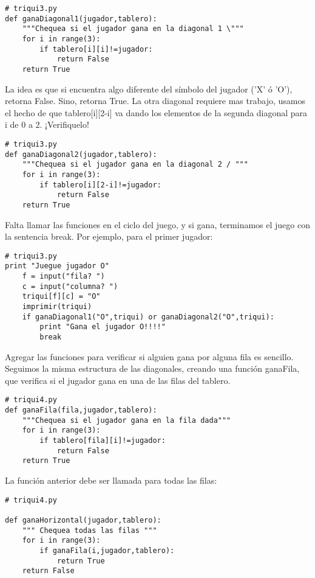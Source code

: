 \beforeverb
\begin{verbatim}
# triqui3.py
def ganaDiagonal1(jugador,tablero):
    """Chequea si el jugador gana en la diagonal 1 \"""
    for i in range(3):
        if tablero[i][i]!=jugador:
            return False
    return True
\end{verbatim}
\afterverb

La idea es que si encuentra algo diferente del símbolo del jugador ('X' ó 'O'),
retorna False. Sino, retorna True. La otra diagonal requiere mas trabajo, usamos 
el hecho de que tablero[i][2-i] va dando los elementos de la segunda
diagonal para i de 0 a 2. ¡Verifiquelo!

\beforeverb
\begin{verbatim}
# triqui3.py
def ganaDiagonal2(jugador,tablero):
    """Chequea si el jugador gana en la diagonal 2 / """
    for i in range(3):
        if tablero[i][2-i]!=jugador:
            return False
    return True
\end{verbatim}
\afterverb

Falta llamar las funciones en el ciclo del juego, y si gana, terminamos el juego 
con la sentencia break. Por ejemplo, para el primer jugador:

\beforeverb
\begin{verbatim}
# triqui3.py
print "Juegue jugador O"
    f = input("fila? ")
    c = input("columna? ")
    triqui[f][c] = "O"
    imprimir(triqui)
    if ganaDiagonal1("O",triqui) or ganaDiagonal2("O",triqui):
        print "Gana el jugador O!!!!"
        break
\end{verbatim}
\afterverb

Agregar las funciones para verificar si alguien gana por alguna fila es sencillo.
Seguimos la misma estructura de las diagonales, creando una función ganaFila, que
verifica si el jugador gana en una de las filas del tablero.

\beforeverb
\begin{verbatim}
# triqui4.py
def ganaFila(fila,jugador,tablero):
    """Chequea si el jugador gana en la fila dada"""
    for i in range(3):
        if tablero[fila][i]!=jugador:
            return False
    return True
\end{verbatim}
\afterverb

La función anterior debe ser llamada para todas las filas:

\beforeverb
\begin{verbatim}
# triqui4.py

def ganaHorizontal(jugador,tablero):
    """ Chequea todas las filas """
    for i in range(3):
        if ganaFila(i,jugador,tablero):
            return True
    return False
\end{verbatim}
\afterverb

